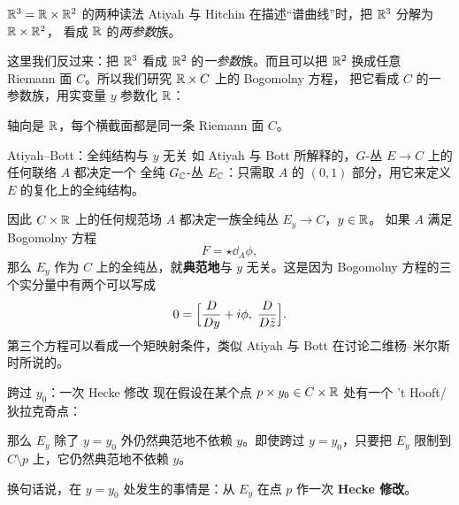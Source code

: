 \begin{frame}{$\mathbb{R}^3=\mathbb{R}\times\mathbb{R}^2$ 的两种读法}
   Atiyah 与 Hitchin 在描述“谱曲线”时，把 $\mathbb{R}^3$ 分解为 $\mathbb{R}\times\mathbb{R}^2$，
  看成 $\mathbb{R}$ 的\emph{两参数}族。
  \vspace{0.4em}

  这里我们反过来：把 $\mathbb{R}^3$ 看成 $\mathbb{R}^2$ 的\emph{一参数}族。而且可以把 $\mathbb{R}^2$
  换成任意 Riemann 面 $C$。所以我们研究 $\mathbb{R}\times C$ 上的 Bogomolny 方程，
  把它看成 $C$ 的一参数族，用实变量 $y$ 参数化 $\mathbb{R}$：
  \begin{center}
  \end{center}
  轴向是 $\mathbb{R}$，每个横截面都是同一条 Riemann 面 $C$。
\end{frame}

\begin{frame}{Atiyah--Bott：全纯结构与 $y$ 无关}
   如 Atiyah 与 Bott 所解释的，$G$-丛 $E\to C$ 上的任何联络 $A$ 都决定一个
  全纯 $G_{\mathbb{C}}$-丛 $E_{\mathbb{C}}$：只需取 $A$ 的 $(0,1)$ 部分，用它来定义 $E$ 的复化上的全纯结构。
  \vspace{0.3em}

  因此 $C\times\mathbb{R}$ 上的任何规范场 $A$ 都决定一族全纯丛 $E_y\to C$，$y\in\mathbb{R}$。
  如果 $A$ 满足 Bogomolny 方程
  \[
    F=\star\dd_A\phi ,
  \]
  那么 $E_y$ 作为 $C$ 上的全纯丛，就\textbf{典范地}与 $y$ 无关。这是因为 Bogomolny
  方程的三个实分量中有两个可以写成
  \[
    0=\Bigl[\frac{D}{Dy}+i\phi,\;\frac{D}{D\bar z}\Bigr].
  \]
  第三个方程可以看成一个矩映射条件，类似 Atiyah 与 Bott 在讨论二维杨--米尔斯时所说的。
\end{frame}

\begin{frame}{跨过 $y_0$：一次 Hecke 修改}
   现在假设在某个点 $p\times y_0\in C\times\mathbb{R}$ 处有一个 't Hooft/狄拉克奇点：
  \begin{center}
  \end{center}
  那么 $E_y$ 除了 $y=y_0$ 外仍然典范地不依赖 $y$。即使跨过 $y=y_0$，只要把 $E_y$
  限制到 $C\setminus p$ 上，它仍然典范地不依赖 $y$。
  \vspace{0.3em}

  换句话说，在 $y=y_0$ 处发生的事情是：从 $E_y$ 在点 $p$ 作一次 \textbf{Hecke 修改}。
\end{frame}

